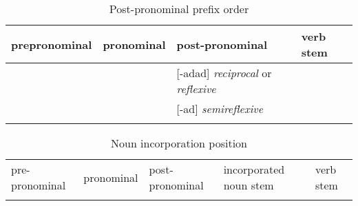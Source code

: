 \lipsum[1-1]



\begin{table}
\caption{Post-pronominal prefix order}
\label{tab:1:postpronorder}
\scriptsize{
\begin{tabularx}{.75\textwidth}{llll}
\lsptoprule
prepronominal & pronominal & post-pronominal & verb stem\\
\midrule
&  & [-adad] \textit{reciprocal} or \textit{reflexive} & \\
&  & [-ad] \textit{semireflexive} & \\
\lspbottomrule
\end{tabularx}}
\end{table}



\begin{table}
\caption{Noun incorporation position}
\label{tab:1:incnounposition}
\scriptsize{
\begin{tabularx}{\textwidth}{XXXXX}
\lsptoprule
pre-pronominal & pronominal & post-pronominal & incorporated noun stem & verb stem\\
\lspbottomrule
\end{tabularx}}
\end{table}

\lipsum[1-1]

